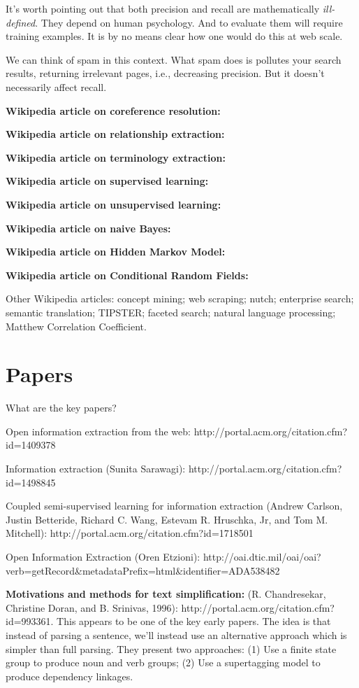 It's worth pointing out that both precision and recall are
mathematically \emph{ill-defined}.  They depend on human psychology.
And to evaluate them will require training examples.  It is by no
means clear how one would do this at web scale.

We can think of spam in this context.  What spam does is pollutes your
search results, returning irrelevant pages, i.e., decreasing
precision.  But it doesn't necessarily affect recall.

\textbf{Wikipedia article on coreference resolution:}

\textbf{Wikipedia article on relationship extraction:}

\textbf{Wikipedia article on terminology extraction:}

\textbf{Wikipedia article on supervised learning:}

\textbf{Wikipedia article on unsupervised learning:}

\textbf{Wikipedia article on naive Bayes:}

\textbf{Wikipedia article on Hidden Markov Model:}

\textbf{Wikipedia article on Conditional Random Fields:}

Other Wikipedia articles: concept mining; web scraping; nutch;
enterprise search; semantic translation; TIPSTER; faceted search;
natural language processing; Matthew Correlation Coefficient.

\section{Papers}

What are the key papers?

Open information extraction from the web:
http://portal.acm.org/citation.cfm?id=1409378

Information extraction (Sunita Sarawagi):
http://portal.acm.org/citation.cfm?id=1498845

Coupled semi-supervised learning for information extraction (Andrew
Carlson, Justin Betteride, Richard C. Wang, Estevam R. Hruschka, Jr,
and Tom M. Mitchell): http://portal.acm.org/citation.cfm?id=1718501

Open Information Extraction (Oren Etzioni):
http://oai.dtic.mil/oai/oai?verb=getRecord\&metadataPrefix=html\&identifier=ADA538482

\textbf{Motivations and methods for text simplification:}
(R. Chandresekar, Christine Doran, and B. Srinivas, 1996):
http://portal.acm.org/citation.cfm?id=993361.  This appears to be one
of the key early papers.  The idea is that instead of parsing a
sentence, we'll instead use an alternative approach which is simpler
than full parsing.  They present two approaches: (1) Use a finite
state group to produce noun and verb groups; (2) Use a supertagging
model to produce dependency linkages.

